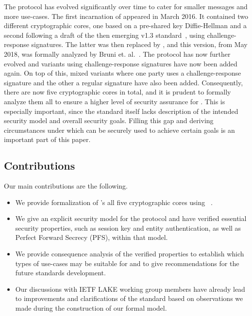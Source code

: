\documentclass[runningheads]{llncs}
\begin{document}
The \mEdhoc protocol has evolved significantly over time to cater for smaller
messages and more use-cases.
%
The first incarnation of \mEdhoc appeared in March 2016.
%
It contained two different cryptographic cores, one based on a
pre-shared key Diffie-Hellman and a second following a draft of the
then emerging \mbox{\mTls v1.3} standard~\cite{ietf-tls-tls13-11}, using
challenge-response signatures.
%
The latter was then replaced by \mSigma, and this version, from May 2018, was
formally analyzed by Bruni et. al.~\cite{DBLP:conf/secsr/BruniJPS18}.
%
The protocol has now further evolved and variants using challenge-response
signatures have now been added again.
%
On top of this, mixed variants where one party uses a challenge-response
signature and the other a regular signature have also been added.
%
Consequently, there are now five cryptographic cores in total, and it is prudent
to formally analyze them all to ensure a higher level of security assurance for
\mEdhoc.
%
This is especially important, since the standard itself lacks description of the
intended security model and overall security goals.
%
Filling this gap and deriving circumstances under which \mEdhoc can be
securely used to achieve certain goals is an important part of this paper.
%

\subsection{Contributions}
\label{sec:contributions}
Our main contributions are the following.
\begin{itemize}
    \item We provide formalization of \mEdhoc's all five cryptographic cores
        using \mTamarin~\cite{DBLP:conf/cav/MeierSCB13}.
    \item We give an explicit security model for the protocol and have verified
        essential security properties, such as session key and entity
        authentication, as well as Perfect Forward Secrecy (PFS), within that
        model.
    \item We provide consequence analysis of the verified properties to
        establish which types of use-cases \mEdhoc may be suitable for and
        to give recommendations for the future standards development.
    \item Our discussions with IETF LAKE working group members have already
        lead to improvements and clarifications of the standard based on
        observations we made during the construction of our formal model.
\end{itemize}
\end{document}
